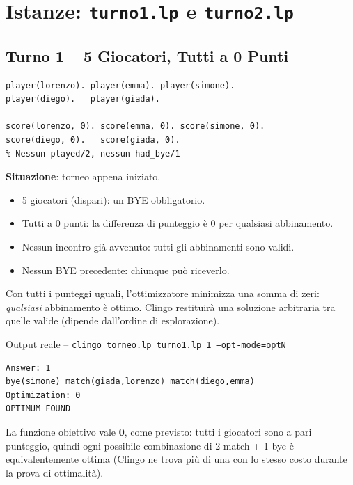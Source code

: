 \documentclass[12pt,a4paper]{article}
\begin{document}
\section{Istanze: \texttt{turno1.lp} e \texttt{turno2.lp}}

\subsection{Turno 1 -- 5 Giocatori, Tutti a 0 Punti}

\begin{lstlisting}
player(lorenzo). player(emma). player(simone).
player(diego).   player(giada).

score(lorenzo, 0). score(emma, 0). score(simone, 0).
score(diego, 0).   score(giada, 0).
% Nessun played/2, nessun had_bye/1
\end{lstlisting}

\textbf{Situazione}: torneo appena iniziato.
\begin{itemize}[noitemsep]
  \item 5 giocatori (dispari): un BYE obbligatorio.
  \item Tutti a 0 punti: la differenza di punteggio è 0 per qualsiasi abbinamento.
  \item Nessun incontro già avvenuto: tutti gli abbinamenti sono validi.
  \item Nessun BYE precedente: chiunque può riceverlo.
\end{itemize}

Con tutti i punteggi uguali, l'ottimizzatore minimizza una somma di zeri:
\emph{qualsiasi} abbinamento è ottimo. Clingo restituirà una soluzione arbitraria
tra quelle valide (dipende dall'ordine di esplorazione).

\begin{exbox}{Output reale -- \texttt{clingo torneo.lp turno1.lp 1 --opt-mode=optN}}
\begin{verbatim}
Answer: 1
bye(simone) match(giada,lorenzo) match(diego,emma)
Optimization: 0
OPTIMUM FOUND
\end{verbatim}
La funzione obiettivo vale \textbf{0}, come previsto: tutti i giocatori sono a
pari punteggio, quindi ogni possibile combinazione di 2 match + 1 bye è
equivalentemente ottima (Clingo ne trova più di una con lo stesso costo
durante la prova di ottimalità).
\end{exbox}
\end{document}
